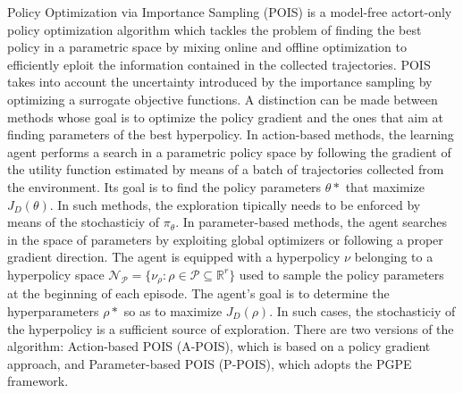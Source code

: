 Policy Optimization via Importance Sampling (POIS) \cite{pois} is a model-free actort-only policy optimization algorithm which tackles the problem of finding the best policy in a parametric space by mixing online and offline optimization to efficiently eploit the information contained in the collected trajectories. POIS takes into account the uncertainty introduced  by the importance sampling by optimizing a surrogate objective functions. 
A distinction can be made between methods whose goal is to optimize the policy gradient and the ones that aim at finding parameters of the best hyperpolicy.
In action-based methods, the learning agent performs a search in a parametric policy space by following the gradient of the utility function estimated by means of a batch of trajectories collected from the environment.
Its goal is to find the policy parameters \(\theta*\) that maximize \(J_D(\theta)\). In such methods, the exploration tipically needs to be enforced by means of the stochasticiy of $\pi_\theta$.
In parameter-based methods, the agent searches in the space of parameters by exploiting global optimizers or following a proper gradient direction. The agent is equipped with a hyperpolicy $\nu$ belonging to a hyperpolicy space \(\mathcal{N}_\mathcal{P} = \{\nu_\rho:\rho \in \mathcal{P} \subseteq \mathbb{R}^r\}\) used to sample the policy parameters at the beginning of each episode. The agent's goal is to determine the hyperparameters \(\rho*\) so as to maximize \(J_D(\rho)\). In such cases, the stochasticiy of the hyperpolicy is a sufficient source of exploration.
There are two versions of the algorithm: Action-based POIS (A-POIS), which is based on a policy gradient approach, and Parameter-based POIS (P-POIS), which adopts the PGPE framework.

